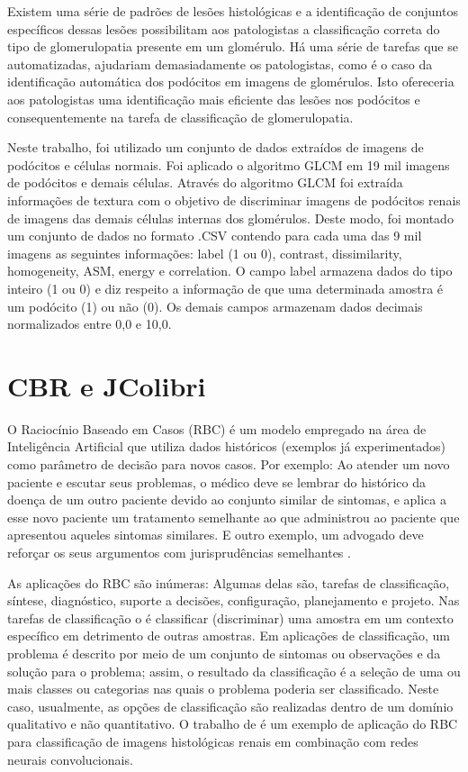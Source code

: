 \documentclass[conference]{IEEEtran}
\begin{document}
Existem uma série de padrões de lesões histológicas e a identificação de conjuntos específicos dessas lesões possibilitam aos patologistas a classificação correta do tipo de glomerulopatia presente em um glomérulo. Há uma série de tarefas que se automatizadas, ajudariam demasiadamente os patologistas, como é o caso da identificação automática dos podócitos em imagens de glomérulos. Isto ofereceria aos patologistas uma identificação mais eficiente das lesões nos podócitos e consequentemente na tarefa de classificação de glomerulopatia. 

Neste trabalho, foi utilizado um conjunto de dados extraídos de imagens de podócitos e células normais. Foi aplicado o algoritmo GLCM em 19 mil imagens de podócitos e demais células. Através do algoritmo GLCM foi extraída informações de textura com o objetivo de discriminar imagens de podócitos renais de imagens das demais células internas dos glomérulos. Deste modo, foi montado um conjunto de dados no formato .CSV contendo para cada uma das 9 mil imagens as seguintes informações: label (1 ou 0), contrast, dissimilarity, homogeneity, ASM, energy e correlation. O campo label armazena dados do tipo inteiro (1 ou 0) e diz respeito a informação de que uma determinada amostra é um podócito (1) ou não (0). Os demais campos armazenam dados decimais normalizados entre 0,0 e 10,0. 

\section{CBR e JColibri}
O Raciocínio Baseado em Casos (RBC) é um modelo empregado na área de Inteligência Artificial que utiliza dados históricos (exemplos já experimentados) como parâmetro de decisão para novos casos. Por exemplo: Ao atender um novo paciente e escutar seus problemas, o médico deve se lembrar do histórico da doença de um outro paciente devido ao conjunto similar de sintomas, e aplica a esse novo paciente um tratamento semelhante ao que administrou ao paciente que apresentou aqueles sintomas similares. E outro exemplo, um advogado deve reforçar os seus argumentos com jurisprudências semelhantes \cite{ref1}.

As aplicações do RBC são inúmeras: Algumas delas são, tarefas de classificação, síntese, diagnóstico, suporte a decisões, configuração, planejamento e projeto. Nas tarefas de classificação o é classificar (discriminar) uma amostra em um contexto específico em detrimento de outras amostras. Em aplicações de classificação, um problema é descrito por meio de um conjunto de sintomas ou observações e da solução para o problema; assim, o resultado da classificação é a seleção de uma ou mais classes ou categorias nas quais o problema poderia ser classificado. Neste caso, usualmente, as opções de classificação são realizadas dentro de um domínio qualitativo e não quantitativo. O trabalho de \cite{ref2} é um exemplo de aplicação do RBC para classificação de imagens histológicas renais em combinação com redes neurais convolucionais.
\end{document}
